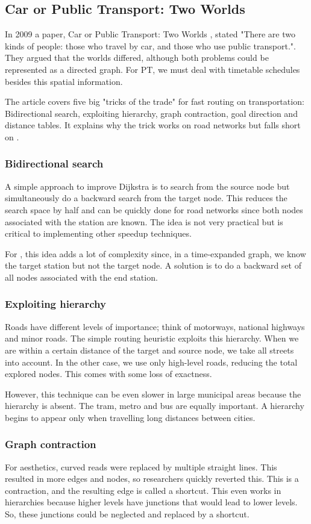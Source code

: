 \subsection{Car or Public Transport: Two Worlds}
In 2009 a paper, Car or Public Transport: Two Worlds \cite{bast_car_2009}, stated "There are two kinds of people: those who travel by car, and those who use public transport.". They argued that the worlds differed, although both problems could be represented as a directed graph. For PT, we must deal with timetable schedules besides this spatial information.

The article covers five big "tricks of the trade" for fast routing on transportation: Bidirectional search, exploiting hierarchy, graph contraction, goal direction and distance tables. It explains why the trick works on road networks but falls short on .

\subsubsection{Bidirectional search}
A simple approach to improve Dijkstra is to search from the source node but simultaneously do a backward search from the target node. This reduces the search space by half and can be quickly done for road networks since both nodes associated with the station are known. The idea is not very practical but is critical to implementing other speedup techniques.

For , this idea adds a lot of complexity since, in a time-expanded graph, we know the target station but not the target node. A solution is to do a backward set of all nodes associated with the end station.
\subsubsection{Exploiting hierarchy}
Roads have different levels of importance; think of motorways, national highways and minor roads. The simple routing heuristic exploits this hierarchy. When we are within a certain distance of the target and source node, we take all streets into account. In the other case, we use only high-level roads, reducing the total explored nodes. This comes with some loss of exactness.

However, this technique can be even slower in large municipal areas because the hierarchy is absent. The tram, metro and bus are equally important. A hierarchy begins to appear only when travelling long distances between cities. 
\subsubsection{Graph contraction}
For aesthetics, curved reads were replaced by multiple straight lines. This resulted in more edges and nodes, so researchers quickly reverted this. This is a contraction, and the resulting edge is called a shortcut. This even works in hierarchies because higher levels have junctions that would lead to lower levels. So, these junctions could be neglected and replaced by a shortcut. 

